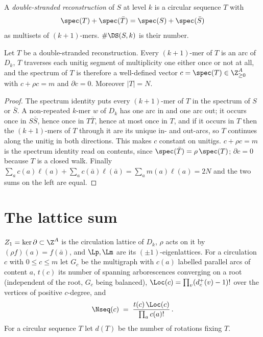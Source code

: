 \begin{definition}\label{ch07:def:ds}
A \emph{double-stranded reconstruction} of $S$ at level $k$ is a circular sequence $T$ with
\[
  \spec(T)+\spec(\bar T)=\spec(S)+\spec(\bar S)
\]
as multisets of $(k{+}1)$-mers. $\#\DS(S,k)$ is their number.
\end{definition}

\begin{lemma}\label{ch07:lem:spectrum}
Let $T$ be a double-stranded reconstruction. Every $(k{+}1)$-mer of $T$ is an arc of $D_k$,
$T$ traverses each unitig segment of multiplicity one either once or not at all, and the
spectrum of $T$ is therefore a well-defined vector $c=\spec(T)\in\Z_{\ge0}^A$ with
$c+\rho c=m$ and $\partial c=0$. Moreover $|T|=N$.
\end{lemma}

\begin{proof}
The spectrum identity puts every $(k{+}1)$-mer of $T$ in the spectrum of $S$ or $\bar S$. A
non-repeated $k$-mer $w$ of $D_k$ has one arc in and one arc out; it occurs once in $S\bar S$,
hence once in $T\bar T$, hence at most once in $T$, and if it occurs in $T$ then the
$(k{+}1)$-mers of $T$ through it are its unique in- and out-arcs, so $T$ continues along the
unitig in both directions. This makes $c$ constant on unitigs. $c+\rho c=m$ is the spectrum
identity read on contents, since $\spec(\bar T)=\rho\,\spec(T)$; $\partial c=0$ because $T$ is
a closed walk. Finally $\sum_a c(a)\ell(a)+\sum_a c(\bar a)\ell(\bar a)=\sum_a m(a)\ell(a)=2N$
and the two sums on the left are equal.
\end{proof}

\section{The lattice sum}\label{ch07:sec:lattice}

\begin{definition}
$Z_1=\ker\partial\subset\Z^A$ is the circulation lattice of $D_k$, $\rho$ acts on it by
$(\rho f)(a)=f(\bar a)$, and $\Lp,\Lm$ are its $(\pm1)$-eigenlattices. For a circulation $c$
with $0\le c\le m$ let $G_c$ be the multigraph with $c(a)$ labelled parallel arcs of content
$a$, $t(c)$ its number of spanning arborescences converging on a root (independent of the
root, $G_c$ being balanced), $\Loc(c)=\prod_v(d^+_c(v)-1)!$ over the vertices of positive
$c$-degree, and
\[
  \Nseq(c)\;=\;\frac{t(c)\,\Loc(c)}{\prod_a c(a)!}\,.
\]
For a circular sequence $T$ let $d(T)$ be the number of rotations fixing $T$.
\end{definition}

